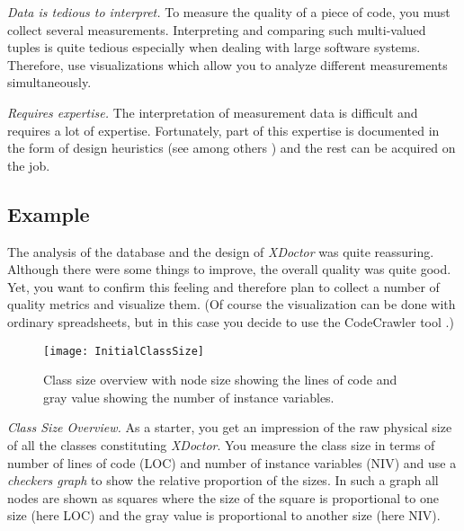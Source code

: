 \documentclass[a4paper,10pt,twoside]{book}
\begin{document}
\begin{bulletlist}
\item \emph{Data is tedious to interpret.} To measure the quality of a piece of code, you 
must collect several measurements. Interpreting and comparing such multi-valued tuples is 
quite tedious especially when dealing with large software systems. Therefore, use 
visualizations which allow you to analyze different measurements simultaneously.

\item \emph{Requires expertise.}
The interpretation of measurement data is difficult and requires a lot of expertise. 
Fortunately, part of this expertise is documented in the form of design heuristics (see 
among others \cite{Riel96a} \cite{Lore94a}) and the rest can be acquired on the job.
\end{bulletlist}

\subsection*{Example}

The analysis of the database and the design of \emph{XDoctor} was quite reassuring. 
Although there were some things to improve, the overall quality was quite good. Yet, you 
want to confirm this feeling and therefore plan to collect a number of quality metrics and 
visualize them. (Of course the visualization can be done with ordinary spreadsheets, but in 
this case you decide to use the CodeCrawler tool \cite{Deme99c} \cite{Lanz99a}.)

\begin{figure}
\begin{center}
\texttt{[image: InitialClassSize]}
\caption{Class size overview with node size showing the lines of code and gray value 
showing the number of instance variables.}
\end{center}
\end{figure}

\noindent
\emph{Class Size Overview.}
As a starter, you get an impression of the raw physical size of all the classes 
constituting \emph{XDoctor}. You measure the class size in terms of number of lines of code 
(LOC) and number of instance variables (NIV) and use a \emph{checkers graph} to show the 
relative proportion of the sizes. In such a graph all nodes are shown as squares where the 
size of the square is proportional to one size (here LOC) and the gray value is 
proportional to another size (here NIV).
\end{document}
